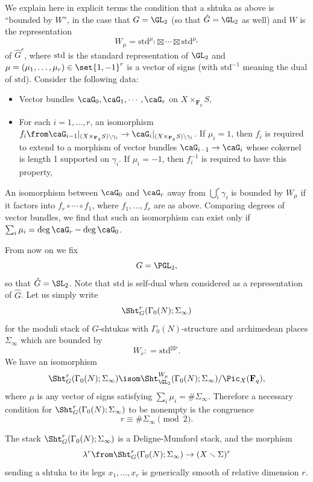 \documentclass{article}
\def\F{\mathbf{F}}
\begin{document}
We explain here in explicit terms the condition that a shtuka as above is ``bounded by $W$'', in the case that $G=\GL_2$ (so that $\hat{G}=\GL_2$ as well) and $W$ is the representation
\[ W_\mu = \mathrm{std}^{\mu_1} \boxtimes \cdots \boxtimes \mathrm{std}^{\mu_r} \]
of $\hat{G}^r$, where $\mathrm{std}$ is the standard representation of $\GL_2$ and $\mu=(\mu_1,\dots,\mu_r)\in\set{1,-1}^r$ is a vector of signs (with $\mathrm{std}^{-1}$ meaning the dual of $\mathrm{std}$).  
Consider the following data:
\begin{itemize}
\item Vector bundles $\caG_0,\caG_1,\cdots,\caG_r$ on $X\times_{\F_q} S$,
\item For each $i=1,\dots,r$, an isomorphism $f_i\from \caG_{i-1}\vert_{(X\times_{\F_q} S)\backslash \gamma_i} \to \caG_i\vert_{(X\times_{\F_q} S)\backslash \gamma_i}$.   If $\mu_i=1$, then $f_i$ is required to extend to a morphism of vector bundles $\caG_{i-1}\to \caG_i$ whose cokernel is length 1 supported on $\gamma_i$.  If $\mu_i=-1$, then $f_i^{-1}$ is required to have this property,
\end{itemize}
An isomorphism between $\caG_0$ and $\caG_r$ away from $\bigcup_i^r \gamma_i$ is bounded by $W_\mu$ if it factors into $f_r\circ\cdots \circ f_1$, where $f_1,\dots,f_r$ are as above.   Comparing degrees of vector bundles, we find that such an isomorphism can exist only if $\sum_i \mu_i = \deg \caG_r-\deg\caG_0$.  

From now on we fix
\[ G = \PGL_2,\] 
so that $\hat{G}=\SL_2$.  Note that $\mathrm{std}$ is self-dual when considered as a representation of $\hat{G}$.  Let us simply write
\[ \Sht_G^r(\Gamma_0(N);\Sigma_\infty) \]
for the moduli stack of $G$-shtukas with $\Gamma_0(N)$-structure and archimedean places $\Sigma_\infty$ which are bounded by
\[ W_r: = \mathrm{std}^{\boxtimes r}. \]
We have an isomorphism
\[ \Sht_G^r(\Gamma_0(N);\Sigma_\infty) \isom \Sht_{\GL_2}^{W_\mu}(\Gamma_0(N);\Sigma_\infty)/\Pic_X(\F_q), \]
 where $\mu$ is any vector of signs satisfying $\sum_i \mu_i=\#\Sigma_\infty$.  Therefore a necessary condition for $\Sht^r_G(\Gamma_0(N);\Sigma_\infty)$ to be nonempty is the congruence
\[ r\equiv \#\Sigma_\infty\pmod{2}.\]

The stack $\Sht_G^r(\Gamma_0(N);\Sigma_\infty)$ is a Deligne-Mumford stack, and the morphism
\[ \lambda^r\from \Sht_G^r(\Gamma_0(N);\Sigma_\infty) \to (X\smallsetminus \Sigma)^r \]
sending a shtuka to its legs $x_1,\dots,x_r$ is generically smooth of relative dimension $r$.  
\end{document}
